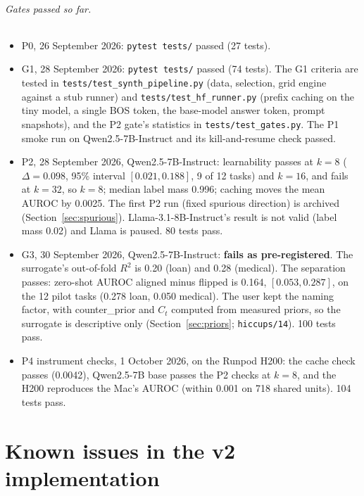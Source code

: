\documentclass[11pt,a4paper]{article}
\newcommand{\1}{\mathbf{1}}
\theoremstyle{plain}
\theoremstyle{definition}
\theoremstyle{remark}
\begin{document}
\paragraph{Gates passed so far.}
\begin{itemize}[nosep]
  \item P0, 26 September 2026: \texttt{pytest tests/} passed (27 tests).
  \item G1, 28 September 2026: \texttt{pytest tests/} passed (74 tests). The
        G1 criteria are tested in \texttt{tests/test\_synth\_pipeline.py}
        (data, selection, grid engine against a stub runner) and
        \texttt{tests/test\_hf\_runner.py} (prefix caching on the tiny model,
        a single BOS token, the base-model answer token, prompt snapshots),
        and the P2 gate's statistics in \texttt{tests/test\_gates.py}.
        The P1 smoke run on Qwen2.5-7B-Instruct and its kill-and-resume
        check passed.
  \item P2, 28 September 2026, Qwen2.5-7B-Instruct: learnability passes at
        $k = 8$ ($\Delta = 0.098$, 95\% interval $[0.021, 0.188]$, 9 of 12
        tasks) and $k = 16$, and fails at $k = 32$, so $k = 8$; median label
        mass 0.996; caching moves the mean AUROC by 0.0025. The first P2 run
        (fixed spurious direction) is archived
        (Section~\ref{sec:spurious}). Llama-3.1-8B-Instruct's result is not
        valid (label mass 0.02) and Llama is paused. 80 tests pass.
  \item G3, 30 September 2026, Qwen2.5-7B-Instruct: \textbf{fails as
        pre-registered}. The surrogate's out-of-fold $R^2$ is 0.20 (loan)
        and 0.28 (medical). The separation passes: zero-shot AUROC aligned
        minus flipped is 0.164, $[0.053, 0.287]$, on the 12 pilot tasks
        (0.278 loan, 0.050 medical). The user kept the naming factor, with
        counter\_prior and $C_t$ computed from measured priors, so the
        surrogate is descriptive only (Section~\ref{sec:priors};
        \texttt{hiccups/14}). 100 tests pass.
  \item P4 instrument checks, 1 October 2026, on the Runpod H200: the cache
        check passes (0.0042), Qwen2.5-7B base passes the P2 checks at
        $k = 8$, and the H200 reproduces the Mac's AUROC (within 0.001 on
        718 shared units). 104 tests pass.
\end{itemize}

\newpage
\part{Known issues in the v2 implementation}
\label{part:issues}
\end{document}
